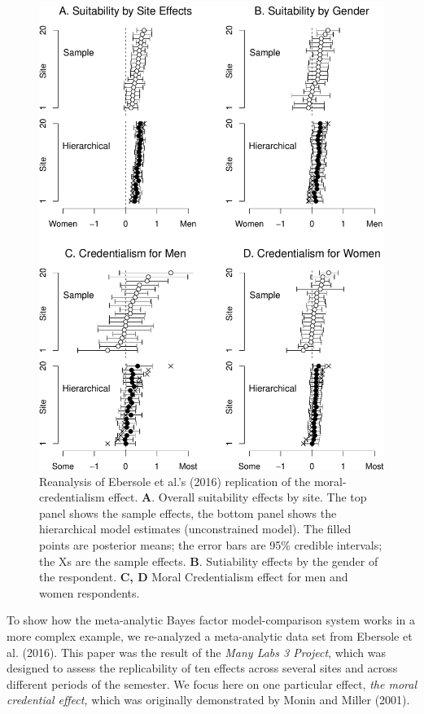 \documentclass[english,man]{apa6}
\theoremstyle{definition}
\theoremstyle{definition}
\theoremstyle{definition}
\theoremstyle{remark}
\begin{document}
\begin{figure}[htbp]
\centering
\includegraphics{p_files/figure-latex/ml3Est-1.pdf}
\caption{\label{fig:ml3Est}Reanalysis of Ebersole et al.'s (2016)
replication of the moral-credentialism effect. \textbf{A}. Overall
suitability effects by site. The top panel shows the sample effects, the
bottom panel shows the hierarchical model estimates (unconstrained
model). The filled points are posterior means; the error bars are 95\%
credible intervals; the Xs are the sample effects. \textbf{B}.
Sutiability effects by the gender of the respondent. \textbf{C, D} Moral
Credentialism effect for men and women respondents.}
\end{figure}

To show how the meta-analytic Bayes factor model-comparison system works
in a more complex example, we re-analyzed a meta-analytic data set from
Ebersole et al. (2016). This paper was the result of the \emph{Many Labs
3 Project}, which was designed to assess the replicability of ten
effects across several sites and across different periods of the
semester. We focus here on one particular effect, \emph{the moral
credential effect,} which was originally demonstrated by Monin and
Miller (2001).
\end{document}
